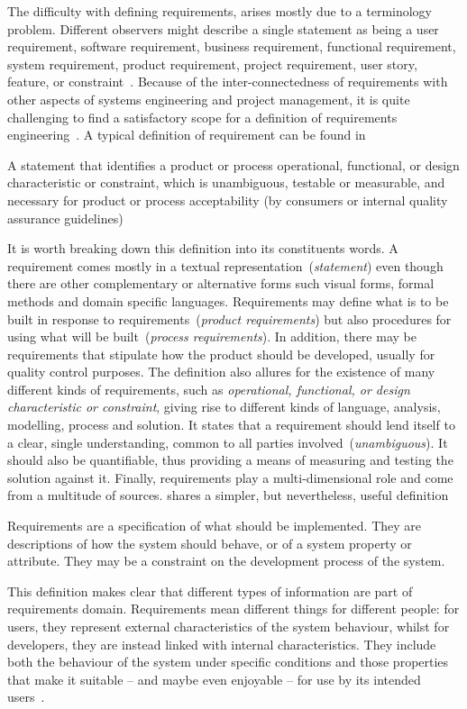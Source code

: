\documentclass[dissertation,final]{softeng}
\begin{document}
The difficulty with defining requirements, arises mostly due to a terminology problem. Different observers might describe a single statement as being a user requirement, software requirement, business requirement, functional requirement, system requirement, product requirement, project requirement, user story, feature, or constraint~\citep{Wiegers2013}. Because of the inter-connectedness of requirements with other aspects of systems engineering and project management, it is quite challenging to find a satisfactory scope for a definition of requirements engineering~\citep{Hull2011}. A typical definition of requirement can be found in ~
\begin{displayquote}
A statement that identifies a product or process operational, functional, or design characteristic or constraint, which is unambiguous, testable or measurable, and necessary for product or process acceptability (by consumers or internal quality assurance guidelines)
\end{displayquote}
It is worth breaking down this definition into its constituents words. A requirement comes mostly in a textual representation~(\emph{statement}) even though there are other complementary or alternative forms such visual forms, formal methods and domain specific languages. Requirements may define what is to be built in response to requirements~(\emph{product requirements}) but also procedures for using what will be built~(\emph{process requirements}). In addition, there may be requirements that stipulate how the product should be developed, usually for quality control purposes. The definition also allures for the existence of many different kinds of requirements, such as \emph{operational, functional, or design characteristic or constraint}, giving rise to different kinds of language, analysis, modelling, process and solution. It states that a requirement should lend itself to a clear, single understanding, common to all parties involved~(\emph{unambiguous}). It should also be quantifiable, thus providing a means of measuring and testing the solution against it. Finally, requirements play a multi-dimensional role and come from a multitude of sources. \citet{Sommerville:1997} shares a simpler, but nevertheless, useful definition
\begin{displayquote}
Requirements are a specification of what should be implemented. They are descriptions of how the system should behave, or of a system property or attribute. They may be a constraint on the development process of the system.
\end{displayquote}
This definition makes clear that different types of information are part of requirements domain. Requirements mean different things for different people: for users, they represent external characteristics of the system behaviour, whilst for developers, they are instead linked with internal characteristics. They include both the behaviour of the system under specific conditions and those properties that make it suitable -- and maybe even enjoyable -- for use by its intended users~\citep{Wiegers2013}.
\end{document}
